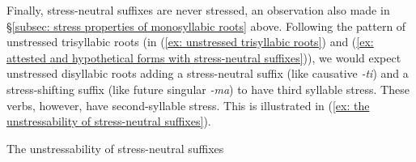Finally, stress-neutral suffixes are never stressed, an observation also made in §\ref{subsec: stress properties of monosyllabic roots} above. Following the pattern of unstressed trisyllabic roots (in (\ref{ex: unstressed trisyllabic roots}) and (\ref{ex: attested and hypothetical forms with stress-neutral suffixes})), we would expect unstressed disyllabic roots adding a stress-neutral suffix (like causative \textit{{}-ti}) and a stress-shifting suffix (like future singular \textit{-ma}) to have third syllable stress. These verbs, however, have second-syllable stress. This is illustrated in (\ref{ex: the unstressability of stress-neutral suffixes}).


\ea\label{ex: the unstressability of stress-neutral suffixes}
{The unstressability of stress-neutral suffixes}

    \z
\z

